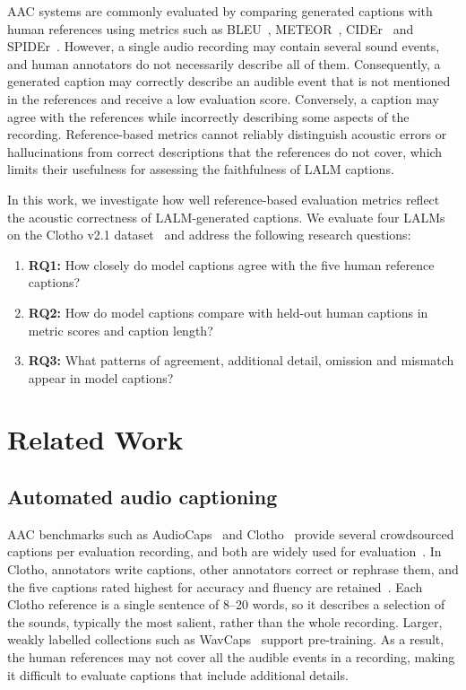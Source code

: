 \documentclass{article}
\begin{document}
AAC systems are commonly evaluated by comparing generated captions with human references using metrics such as
BLEU~\cite{papineni2002bleu}, METEOR~\cite{banerjee2005meteor}, CIDEr~\cite{vedantam2015cider} and
SPIDEr~\cite{liu2017spider}. However, a single audio recording may contain several sound events, and human
annotators do not necessarily describe all of them. Consequently, a generated caption may correctly describe an
audible event that is not mentioned in the references and receive a low evaluation score. Conversely, a caption may
agree with the references while incorrectly describing some aspects of the recording. Reference-based metrics cannot
reliably distinguish acoustic errors or hallucinations from correct descriptions that the references do not cover,
which limits their usefulness for assessing the faithfulness of LALM captions.

In this work, we investigate how well reference-based evaluation metrics reflect the acoustic correctness of
LALM-generated captions. We evaluate four LALMs on the Clotho v2.1 dataset~\cite{drossos2020clotho} and address the
following research questions:

\begin{enumerate}
\item \textbf{RQ1:} How closely do model captions agree with the five human reference captions?
\item \textbf{RQ2:} How do model captions compare with held-out human captions in metric scores and caption length?
\item \textbf{RQ3:} What patterns of agreement, additional detail, omission and mismatch appear in model captions?
\end{enumerate}


\section{Related Work}
\label{sec:related}

\subsection{Automated audio captioning}
\label{ssec:rw-aac}

AAC benchmarks such as AudioCaps~\cite{kim2019audiocaps} and Clotho~\cite{drossos2020clotho} provide several
crowdsourced captions per evaluation recording, and both are widely used for evaluation~\cite{mei2022overview}.
In Clotho, annotators write captions, other annotators correct or rephrase them, and the five captions rated highest
for accuracy and fluency are retained~\cite{lipping2019crowdsourcing}. Each Clotho reference is a single sentence of 8--20
words, so it describes a selection of the sounds, typically the most salient, rather than the whole recording.
Larger, weakly labelled collections such as WavCaps~\cite{mei2024wavcaps} support pre-training. As a result, the human references may not cover all the audible events in a recording, making
it difficult to evaluate captions that include additional details.
\end{document}
